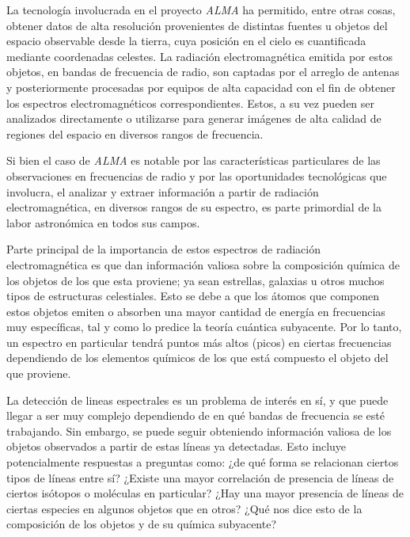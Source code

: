 \begin{intro}
La tecnología involucrada en el proyecto \textit{ALMA} ha permitido, entre otras cosas, obtener datos de alta resolución provenientes de distintas fuentes u objetos del espacio observable desde la tierra, cuya posición en el cielo es cuantificada mediante coordenadas celestes. La radiación electromagnética emitida por estos objetos, en bandas de frecuencia de radio, son captadas por el arreglo de antenas y posteriormente procesadas por equipos de alta capacidad con el fin de obtener los espectros electromagnéticos correspondientes. Estos, a su vez pueden ser analizados directamente o utilizarse para generar imágenes de alta calidad de regiones del espacio en diversos rangos de frecuencia.

Si bien el caso de \textit{ALMA} es notable por las características particulares de las observaciones en frecuencias de radio y por las oportunidades tecnológicas que involucra, el analizar y extraer información a partir de radiación electromagnética, en diversos rangos de su espectro, es parte primordial de la labor astronómica en todos sus campos.

Parte principal de la importancia de estos espectros de radiación electromagnética es que dan información valiosa sobre la composición química de los objetos de los que esta proviene; ya sean estrellas, galaxias u otros muchos tipos de estructuras celestiales. Esto se debe a que los átomos que componen estos objetos emiten o absorben una mayor cantidad de energía en frecuencias muy específicas, tal y como lo predice la teoría cuántica subyacente. Por lo tanto, un espectro en particular tendrá puntos más altos (picos) en ciertas frecuencias dependiendo de los elementos químicos de los que está compuesto el objeto del que proviene.

La detección de lineas espectrales es un problema de interés en sí, y que puede llegar a ser muy complejo dependiendo de en qué bandas de frecuencia se esté trabajando. Sin embargo, se puede seguir obteniendo información valiosa de los objetos observados a partir de estas líneas ya detectadas. Esto incluye potencialmente respuestas a preguntas como: ¿de qué forma se relacionan ciertos tipos de líneas entre sí? ¿Existe una mayor correlación de presencia de líneas de ciertos isótopos o moléculas en particular? ¿Hay una mayor presencia de líneas de ciertas especies en algunos objetos que en otros? ¿Qué nos dice esto de la composición de los objetos y de su química subyacente?


\end{intro}